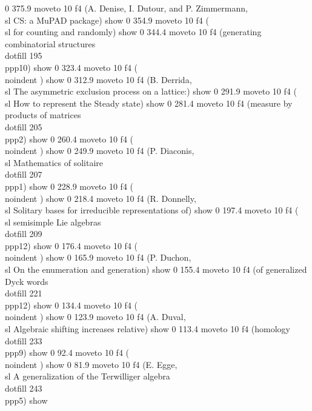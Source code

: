 0 375.9 moveto
10 f4
(A. Denise, I. Dutour, and P. Zimmermann,  {\\sl CS: a MuPAD package}) show
0 354.9 moveto
10 f4
({\\sl for counting and randomly) show
0 344.4 moveto
10 f4
(generating combinatorial structures}\\dotfill   195\\ppp{10}) show
0 323.4 moveto
10 f4
(\\noindent     ) show
0 312.9 moveto
10 f4
(B. Derrida,  {\\sl The asymmetric exclusion process on a lattice:}) show
0 291.9 moveto
10 f4
({\\sl  How to represent the Steady state) show
0 281.4 moveto
10 f4
(measure by products of matrices}\\dotfill   205\\ppp{2}) show
0 260.4 moveto
10 f4
(\\noindent ) show
0 249.9 moveto
10 f4
(P. Diaconis, {\\sl Mathematics of solitaire}\\dotfill 207\\ppp{1}) show
0 228.9 moveto
10 f4
(\\noindent     ) show
0 218.4 moveto
10 f4
(R. Donnelly,  {\\sl Solitary bases for irreducible representations of}) show
0 197.4 moveto
10 f4
({\\sl semisimple Lie algebras}\\dotfill   209\\ppp{12}) show
0 176.4 moveto
10 f4
(\\noindent     ) show
0 165.9 moveto
10 f4
(P. Duchon,  {\\sl On the enumeration and generation) show
0 155.4 moveto
10 f4
(of generalized Dyck words}\\dotfill   221\\ppp{12}) show
0 134.4 moveto
10 f4
(\\noindent     ) show
0 123.9 moveto
10 f4
(A. Duval,  {\\sl Algebraic shifting increases relative) show
0 113.4 moveto
10 f4
(homology}\\dotfill   233\\ppp{9}) show
0 92.4 moveto
10 f4
(\\noindent     ) show
0 81.9 moveto
10 f4
(E. Egge,  {\\sl A generalization of the Terwilliger algebra}\\dotfill   243\\ppp{5}) show
